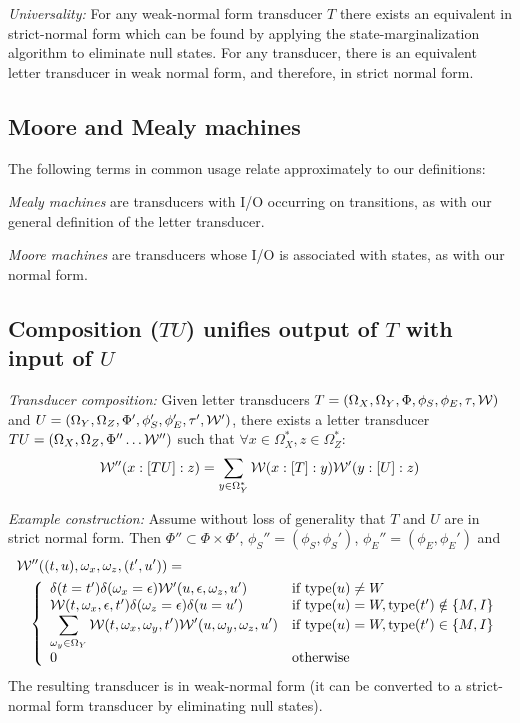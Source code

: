 \documentclass{article}
\newcommand\wtrans[4]{#1(#2 : [#3] : #4)}
\newcommand\compose{}
\newcommand\States{\Phi}
\newcommand\Transitions{\tau}
\newcommand\startstate{\phi_S}
\newcommand\laststate{\phi_E}
\newcommand\weight{{\cal W}}
\newcommand\statetype{\mbox{type}}
\begin{document}
{\em Universality:}
For any weak-normal form transducer $T$ there exists an equivalent in strict-normal form which can be found by applying the state-marginalization algorithm to eliminate null states.
For any transducer, there is an equivalent letter transducer in weak normal form, and therefore, in strict normal form.

\subsection{Moore and Mealy machines}

The following terms in common usage relate approximately to our definitions:

{\em Mealy machines} are transducers with I/O occurring on transitions, as with our general definition of the letter transducer.

{\em Moore machines} are transducers whose I/O is associated with states, as with our normal form.

\subsection{Composition ($T\compose U$) unifies output of $T$ with input of $U$}

{\em Transducer composition:}
Given letter transducers
 $T = (\Omega_X, \Omega_Y, \States, \startstate, \laststate, \Transitions, \weight)$ and
 $U = (\Omega_Y, \Omega_Z, \States', \startstate', \laststate', \Transitions', \weight')$,
there exists a letter transducer $T\compose U = (\Omega_X, \Omega_Z, \States'' \ldots \weight'')$ 
such that $\forall x \in \Omega_X^\ast, z \in \Omega_Z^\ast$:
\[
\wtrans{\weight''}{x}{T\compose U}{z} = \sum_{y\in\Omega_Y^\ast} \wtrans{\weight}{x}{T}{y} \wtrans{\weight'}{y}{U}{z}
\]

{\em Example construction:}
Assume without loss of generality that $T$ and $U$ are in strict normal form.
Then $\States'' \subset \States \times \States'$,
$\startstate''=(\startstate,\startstate')$, $\laststate''=(\laststate,\laststate')$
and
\begin{eqnarray*}
\lefteqn{\weight''((t,u),\omega_x,\omega_z,(t',u')) =} & & \\
& & \left\{ \begin{array}{ll}
\delta(t=t') \delta(\omega_x=\epsilon) \weight'(u,\epsilon,\omega_z,u') & \mbox{if $\statetype(u) \neq W$} \\
\weight(t,\omega_x,\epsilon,t') \delta(\omega_z=\epsilon) \delta(u=u') & \mbox{if $\statetype(u) = W,\statetype(t') \notin \{M,I\}$} \\
\displaystyle
\sum_{\omega_y \in \Omega_Y} \weight(t,\omega_x,\omega_y,t') \weight'(u,\omega_y,\omega_z,u') & \mbox{if $\statetype(u) = W,\statetype(t') \in \{M,I\}$} \\
0 & \mbox{otherwise}
\end{array} \right.
\end{eqnarray*}
The resulting transducer is in weak-normal form (it can be converted to a strict-normal form transducer by eliminating null states).
\end{document}
